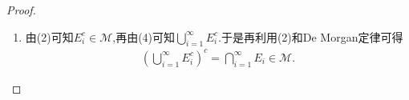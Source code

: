 \documentclass[../../main.tex]{subfiles}%
\begin{document}
\begin{proof}
\begin{enumerate}[(1)]
令 \(k \to \infty\), 就有
\begin{align*}
m^*(T) \geqslant  \sum_{i = 1}^{\infty} m^*(T \cap E_i) + m^*(T \cap S^c).
\end{align*}
再由外测度的次可加性可得
\begin{align*}
m^*(T)&\geqslant \sum_{i=1}^{\infty}{m^*(T}\cap E_i)+m^*(T\cap S^c)\geqslant m^*(\bigcup_{i=1}^{\infty}{\left( T\cap E_i \right)})+m^*(T\cap S^c)
\\
&=m^*(T\cap \bigcup_{i=1}^{\infty}{E_i})+m^*(T\cap S^c)=m^*(T\cap S)+m^*(T\cap S^c).
\end{align*}
这说明 \(S \in \mathscr{M}\).
此外, 在公式
\begin{align*}
m^*(T) \geqslant  \sum_{i = 1}^{\infty} m^*(T \cap E_i) + m^*(T \cap S^c)
\end{align*}
中以 \(T \cap S\) 替换 \(T\), 则又可得
\begin{align*}
m^*(T \cap S) \geqslant  \sum_{i = 1}^{\infty} m^*(T \cap E_i).
\end{align*}
又由外测度的次可加性可知反向不等式总是成立的, 因而实际上有
\begin{align*}
m^*(T \cap S) = \sum_{i = 1}^{\infty} m^*(T \cap E_i).
\end{align*}
在这里再取 \(T\) 为全空间 \(\mathbb{R}^n\), 就可证明可数可加性质:
\begin{align*}
m^*(S) = m^*\left(\bigcup_{i = 1}^{\infty} E_i\right) = \sum_{i = 1}^{\infty} m^*(E_i).
\end{align*}

其次, 对于一般的可测集列 \(\{E_i\}\), 我们令
\[
S_1 = E_1, \quad S_k = E_k \setminus \left(\bigcup_{i = 1}^{k - 1} E_i\right), \quad k \geqslant  2,
\]
则 \(\{S_k\}\) 是互不相交的可测集列. 而由 \(\bigcup_{i = 1}^{\infty} E_i = \bigcup_{k = 1}^{\infty} S_k\) 可知, \(\bigcup_{i = 1}^{\infty} E_i\) 是可测集.

\item 由(2)可知$E_i^c\in \mathscr{M}$,再由(4)可知$\bigcup_{i = 1}^{\infty} E_i^c$.于是再利用(2)和De Morgan定律可得
\begin{align*}
\left( \bigcup_{i=1}^{\infty}{E_{i}^{c}} \right) ^c=\bigcap_{i=1}^{\infty}{E_i}\in \mathscr{M} .
\end{align*}


\end{enumerate}
\end{proof}
\end{document}
